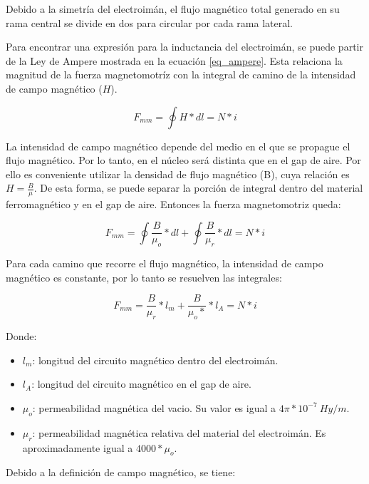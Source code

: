 \noindent Debido a la simetría del electroimán, el flujo magnético total generado en su rama central se divide en dos para circular por cada rama lateral.

\noindent Para encontrar una expresión para la inductancia del electroimán, se puede partir de la Ley de Ampere mostrada en la ecuación \ref{eq_ampere}. Esta relaciona la magnitud de la fuerza magnetomotríz con la integral de camino de la intensidad de campo magnético ($H$).

\begin{equation} \label{eq_ampere}
	F_{mm}=\oint{H*dl}=N*i
\end{equation}

\noindent La intensidad de campo magnético depende del medio en el que se propague el flujo magnético. Por lo tanto, en el núcleo será distinta que en el gap de aire. Por ello es conveniente utilizar la densidad de flujo magnético (B), cuya relación es $H=\frac{B}{\mu}$. De esta forma, se puede separar la porción de integral dentro del material ferromagnético y en el gap de aire. Entonces la fuerza magnetomotriz queda:

\begin{equation} 
	F_{mm}=\oint{\frac{B}{\mu_{o}}*dl}+\oint{\frac{B}{\mu_{r}}*dl}=N*i
\end{equation}

\noindent Para cada camino que recorre el flujo magnético, la intensidad de campo magnético es constante, por lo tanto se resuelven las integrales:

\begin{equation}\label{eq_fuerza-mm}
	F_{mm}=\frac{B}{\mu_{r}}*l_{m}+\frac{B}{\mu_{o}*}*l_{A}=N*i
\end{equation}

Donde:
\begin{itemize}
	\item $l_{m}$: longitud del circuito magnético dentro del electroimán.
	\item $l_{A}$: longitud del circuito magnético en el gap de aire.
	\item $\mu_{o}$: permeabilidad magnética del vacio. Su valor es igual a $4 \pi * 10^{-7}\:Hy/m$.
	\item $\mu_{r}$: permeabilidad magnética relativa del material del electroimán. Es aproximadamente igual a $4000 * \mu_{o}$.

\end{itemize}

\noindent Debido a la definición de campo magnético, se tiene:

